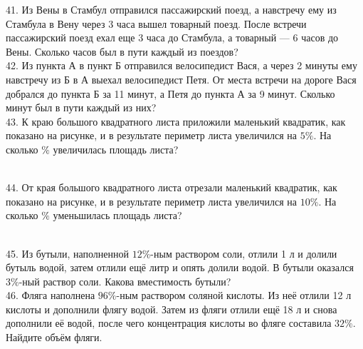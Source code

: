 \documentclass[12pt]{article}
\begin{document}
41. Из Вены в Стамбул отправился пассажирский поезд, а навстречу ему из Стамбула в Вену через 3 часа вышел товарный поезд. После встречи пассажирский поезд ехал еще 3 часа до Стамбула, а товарный ---
6 часов до Вены. Сколько часов был в пути каждый из поездов?\\
42. Из пункта А в пункт Б отправился велосипедист Вася, а через 2 минуты ему навстречу из Б в А выехал велосипедист Петя. От места встречи на дороге Вася добрался до пункта Б за 11 минут, а Петя до пункта А за 9 минут. Сколько минут был в пути каждый из них?\\
43. К краю большого квадратного листа приложили маленький квадратик, как показано на рисунке, и в результате периметр листа увеличился на $5\%.$ На сколько $\%$ увеличилась площадь листа?
\begin{figure}[h]
\end{figure}\\
44. От края большого квадратного листа отрезали маленький квадратик, как показано на рисунке, и в результате периметр листа увеличился на $10\%.$ На сколько $\%$ уменьшилась площадь листа?
\begin{figure}[h]
\end{figure}\\
45. Из бутыли, наполненной $12\%$-ным раствором соли, отлили 1 л и долили бутыль водой, затем отлили ещё литр и опять долили водой. В бутыли оказался $3\%$-ный раствор соли. Какова вместимость бутыли?\\
46. Фляга наполнена $96\%$-ным раствором соляной кислоты. Из неё отлили 12 л кислоты и дополнили флягу водой. Затем из фляги отлили ещё 18 л и снова дополнили её водой, после чего концентрация кислоты во фляге составила $32\%.$ Найдите объём фляги.\\
\end{document}
